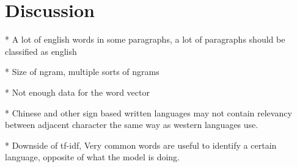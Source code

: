 \documentclass[conference]{IEEEtran}
\begin{document}
\section{Discussion}
* A lot of english words in some paragraphs, a lot of paragraphs should be classified as english

* Size of ngram, multiple sorts of ngrams

* Not enough data for the word vector

* Chinese and other sign based written languages may not contain relevancy between adjacent character the same way as western languages use.

* Downside of tf-idf, Very common words are useful to identify a certain language, opposite of what the model is doing.
%
%



%
%
\end{document}
